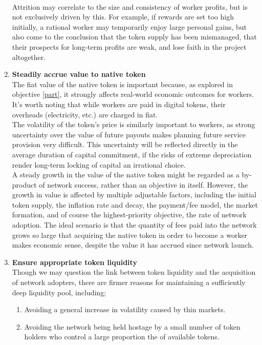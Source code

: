 \documentclass[11pt]{amsart}
\begin{document}
\begin{enumerate}
   \\
   Attrition may correlate to the size and consistency of worker profits, but is not exclusively driven by this. For example, if rewards are set too high initially, a rational worker may temporarily enjoy large personal gains, but also come to the conclusion that the token supply has been mismanaged, that their prospects for long-term profits are weak, and lose faith in the project altogether. 
   \\
   \item \textbf{Steadily accrue value to native token} \label{value}
   \\
   The fiat value of the native token is important because, as explored in objective \ref{part}, it strongly affects real-world economic outcomes for workers. It's worth noting that while workers are paid in digital tokens, their overheads (electricity, etc.) are charged in fiat. 
   \\
   The volatility of the token's price is similarly important to workers, as strong uncertainty over the value of future payouts makes planning future service provision very difficult. This uncertainty will be reflected directly in the average duration of capital commitment, if the risks of extreme depreciation render long-term locking of capital an irrational choice. 
   \\
   A steady growth in the value of the native token might be regarded as a by-product of network success, rather than an objective in itself. However, the growth in value is affected by multiple adjustable factors, including the initial token supply, the inflation rate and decay, the payment/fee model, the market formation, and of course the highest-priority objective, the rate of network adoption. The ideal scenario is that the quantity of fees paid into the network grows so large that acquiring the native token in order to become a worker makes economic sense, despite the value it has accrued since network launch.  
   \\
   \item \textbf{Ensure appropriate token liquidity}\label{liquid}
   \\
   Though we may question the link between token liquidity and the acquisition of network adopters, there are firmer reasons for maintaining a sufficiently deep liquidity pool, including;
   \begin{enumerate}
   \item Avoiding a general increase in volatility caused by thin markets.
   \item Avoiding the network being held hostage by a small number of token holders who control a large proportion the of available tokens. 

\end{enumerate}
\end{enumerate}
\end{document}
